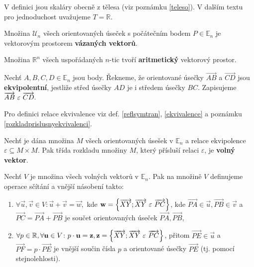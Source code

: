 \begin{pozn}
    V definici jsou skaláry obecně z tělesa (viz poznámku \ref{teleso}). V dalším textu
    pro jednoduchost uvažujeme $T=\mathbb R$.
\end{pozn}

\begin{pozn}
    Množina $\mathscr U_n$ všech orientovaných úseček s počátečním bodem $P\in \mathbb E_n$
    je vektorovým prostorem
    \textbf{vázaných vektorů}.
\end{pozn}

\begin{pozn}
    Množina $\mathbb R^{n}$ všech uspořádaných $n$-tic tvoří \textbf{aritmetický}
    vektorový prostor.
\end{pozn}

\begin{definition}
    Nechť $A,B,C,D \in \mathbb E_n$ jsou body. Řekneme, že orientované úsečky
    $\overrightarrow{AB}$ a $\overrightarrow{CD}$ jsou \textbf{ekvipolentní}, jestliže
    střed úsečky $AD$ je i středem úsečky $BC$. Zapisujeme $\overrightarrow{AB} \operatorname{\,\varepsilon\,} \overrightarrow{CD}.$
\end{definition}

\begin{pozn}
    Pro definici relace ekvivalence viz def. \ref{reflsymtran}, \ref{ekvivalence} a poznámku \ref{rozkladprislusnyekvivalenci}.
\end{pozn}

\begin{definition}
    Nechť je dána množina $M$ všech orientovaných úsešek v $\mathbb E_n$ a
    relace ekvipolence $\varepsilon \subseteq M\times M.$ Pak třída rozkladu množiny
    $M$, který přísluší relaci $\varepsilon$, je \textbf{volný vektor}.
\end{definition}

\begin{definition}
    Nechť $V$ je množina všech volných vektorů v $\mathbb E_n$. Pak na množině $V$ definujeme
    operace sčítání a vnější násobení takto:
    \begin{enumerate}[$i.$]
    \item $\forall \vec u, \vec v \in V\colon \vec u + \vec v = \vec w,$ kde $\boldsymbol{\mathbf{w}} = \left \{ \overrightarrow{XY}; \overrightarrow{XY} \operatorname{\,\varepsilon\,} \overrightarrow{PC} \right \} $, kde $\overrightarrow{PA}\in\vec u, \overrightarrow{PB}\in \vec v$ a $\overrightarrow{PC}=\overrightarrow{PA}+\overrightarrow{PB}$ je součet orientovaných úseček $\overrightarrow{PA},\overrightarrow{PB}$,
   	\item $\forall p \in \mathbb R, \forall \boldsymbol{\mathbf{u}} \in V\colon p\cdot \boldsymbol{\mathbf{u}} = \boldsymbol{\mathbf{z}}, \boldsymbol{\mathbf{z}} = \left \{ \overrightarrow{XY}; \overrightarrow{XY} \operatorname{\,\varepsilon\,} \overrightarrow{PC} \right \} $, přitom $\overrightarrow{PE}\in \vec u$ a $\overrightarrow{PF} = p\cdot \overrightarrow{PE}$ je vnější součin čísla $p$ a orientované úsečky $\overrightarrow{PE}$ (tj. pomocí stejnolehlosti).
    \end{enumerate}
\end{definition}

